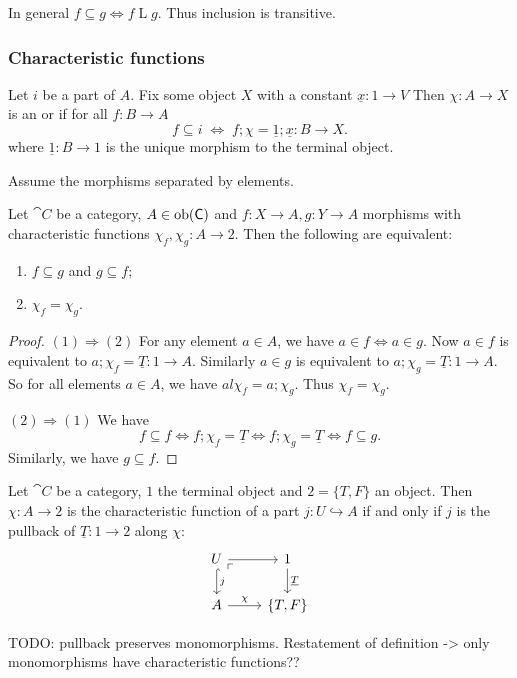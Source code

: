 In general $f \subseteq g \iff f\mathrel{L}g$. Thus inclusion is transitive.

\subsubsection{Characteristic functions}
\begin{definition}
Let $i$ be a part of $A$. Fix some object $X$ with a constant $\underline{x}: 1\to V$ Then $\chi: A \to X$ is an  or  if for all $f: B\to A$
\[ f\subseteq i \;\iff\; f;\chi = \underline{1};\underline{x}: B\to X.  \]
where $\underline{1}: B\to 1$ is the unique morphism to the terminal object.
\end{definition}

Assume the morphisms separated by elements.
\begin{proposition}
Let $\cat{C}$ be a category, $A\in\operatorname{ob}(\mathsf{C})$ and $f: X\to A,g: Y\to A$ morphisms with characteristic functions $\chi_f, \chi_g: A\to 2$. Then the following are equivalent:
\begin{enumerate}
\item $f \subseteq g$ and $g \subseteq f$;
\item $\chi_f = \chi_g$.
\end{enumerate}
\end{proposition}
\begin{proof}
$(1) \Rightarrow (2)$ For any element $a \in A$, we have $a \in f \iff a\in g$. Now $a\in f$ is equivalent to $a; \chi_f = \underline{T}:1\to A$. Similarly $a\in g$ is equivalent to $a; \chi_g = \underline{T}:1\to A$. So for all elements $a\in A$, we have $al \chi_f = a; \chi_g$. Thus $\chi_f = \chi_g$.

$(2) \Rightarrow (1)$ We have
\[ f \subseteq f \iff f;\chi_f = \underline{T} \iff f;\chi_g = \underline{T} \iff f \subseteq g. \]
Similarly, we have $g \subseteq f$.
\end{proof}

\begin{lemma}
Let $\cat{C}$ be a category, $1$ the terminal object and $2 = \{T,F\}$ an object. Then $\chi: A\to 2$ is the characteristic function of a part $j: U\hookrightarrow A$ \textup{if and only if} $j$ is the pullback of $\underline{T}: 1\to 2$ along $\chi$:
\[ \begin{tikzcd}
U \arrow[r] \arrow[d, hook, "j"] \pbCorner & 1 \arrow[d, "\underline{T}"] \\
A \arrow[r, "\chi"] & \{T,F\}
\end{tikzcd} \]
\end{lemma}
TODO: pullback preserves monomorphisms. Restatement of definition -> only monomorphisms have characteristic functions??


